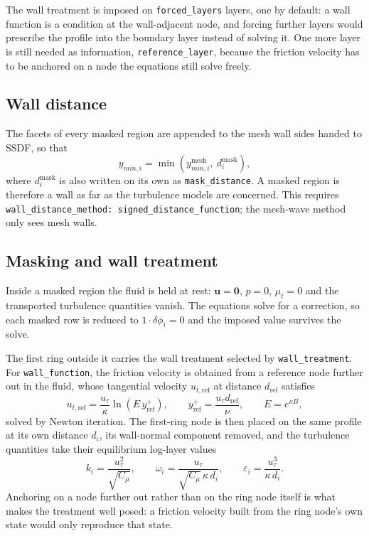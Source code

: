 \documentclass[12pt]{extarticle}
\newcommand{\<}{\langle}
\renewcommand{\>}{\rangle}
\theoremstyle{definition}
\begin{document}
The wall treatment is imposed on \texttt{forced\_layers} layers, one by default:
a wall function is a condition at the wall-adjacent node, and forcing further
layers would prescribe the profile into the boundary layer instead of solving
it. One more layer is still needed as information, \texttt{reference\_layer},
because the friction velocity has to be anchored on a node the equations still
solve freely.

\subsection{Wall distance}

The facets of every masked region are appended to the mesh wall sides handed to SSDF, so
that
\begin{equation}
    y_{min,i} = \min\left(y^{\text{mesh}}_{min,i},\ d_i^{\text{mask}}\right),
\end{equation}
where $d_i^{\text{mask}}$ is also written on its own as
\texttt{mask\_distance}. A masked region is therefore a wall as far as the
turbulence models are concerned. This requires
\texttt{wall\_distance\_method: signed\_distance\_function}; the mesh-wave method
only sees mesh walls.

\subsection{Masking and wall treatment}

Inside a masked region the fluid is held at rest: $\mathbf{u} = \mathbf{0}$, $p = 0$,
$\mu_t = 0$ and the transported turbulence quantities vanish. The equations solve
for a correction, so each masked row is reduced to $1 \cdot \delta\phi_i = 0$ and
the imposed value survives the solve.

The first ring outside it carries the wall treatment selected by
\texttt{wall\_treatment}. For \texttt{wall\_function}, the friction velocity is
obtained from a reference node further out in the fluid, whose tangential
velocity $u_{t,\text{ref}}$ at distance $d_\text{ref}$ satisfies
\begin{equation}
    u_{t,\text{ref}} = \frac{u_\tau}{\kappa} \ln\left(E\, y^+_\text{ref}\right),
    \qquad y^+_\text{ref} = \frac{u_\tau d_\text{ref}}{\nu},
    \qquad E = e^{\kappa B},
\end{equation}
solved by Newton iteration. The first-ring node is then placed on the same
profile at its own distance $d_i$, its wall-normal component removed, and the
turbulence quantities take their equilibrium log-layer values
\begin{equation}
    k_i = \frac{u_\tau^2}{\sqrt{C_\mu}},
    \qquad
    \omega_i = \frac{u_\tau}{\sqrt{C_\mu}\,\kappa\, d_i},
    \qquad
    \varepsilon_i = \frac{u_\tau^3}{\kappa\, d_i}.
\end{equation}
Anchoring on a node further out rather than on the ring node itself is what makes
the treatment well posed: a friction velocity built from the ring node's own
state would only reproduce that state.
\end{document}
